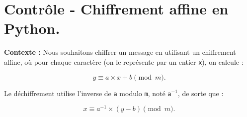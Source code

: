 \documentclass[12pt,a4paper]{article}
\begin{document}
\section*{Contrôle - Chiffrement affine en Python.}

\textbf{Contexte :}  
Nous souhaitons chiffrer un message en utilisant un chiffrement affine, où pour chaque caractère
(on le représente par un entier \texttt{x}), on calcule :

\[
y \equiv a \times x + b \pmod{m}.
\]

Le déchiffrement utilise l’inverse de \texttt{a} modulo \texttt{m}, noté \texttt{a\(^{-1}\)}, de sorte que :

\[
x \equiv a^{-1} \times (y - b) \pmod{m}.
\]

%
\end{document}
